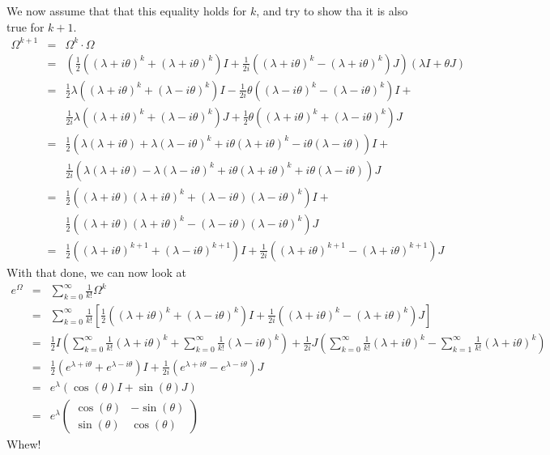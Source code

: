 \documentclass{article}
\newcommand{\twomatrix}[4]{\left(\begin{array}{cc} #1 & #2\\ #3 & #4 \end{array}\right)}
\begin{document}
We now assume that that this equality holds for $k$, and try to show tha it is also true for $k+1$.
\begin{eqnarray*}
\Omega^{k+1} &=&  \Omega^k \cdot \Omega\\
&=& \left( \frac{1}{2}\left((\lambda + i\theta)^k + (\lambda + i\theta)^k \right)I
  + \frac{1}{2i}\left((\lambda + i\theta)^k - (\lambda + i\theta)^k \right)J \right)(\lambda I + \theta J)\\
  &=& \frac{1}{2}\lambda\left( (\lambda + i\theta)^k + (\lambda - i\theta)^k \right)I  
     - \frac{1}{2i}\theta\left( (\lambda - i\theta)^k - (\lambda - i\theta)^k \right)I +\\
  &&  \frac{1}{2i}\lambda\left( (\lambda + i\theta)^k + (\lambda - i\theta)^k \right)J +
      \frac{1}{2}\theta\left( (\lambda + i\theta)^k + (\lambda - i\theta)^k \right)J\\
  &=& \frac{1}{2}\left( \lambda(\lambda + i\theta) + \lambda(\lambda - i\theta)^k +
                        i\theta(\lambda + i\theta)^k - i\theta(\lambda-i\theta)\right)I + \\
  && \frac{1}{2i}\left( \lambda(\lambda + i\theta) - \lambda(\lambda - i\theta)^k +
                        i\theta(\lambda + i\theta)^k + i\theta(\lambda-i\theta)\right)J\\
  &=& \frac{1}{2}\left((\lambda + i\theta)(\lambda + i\theta)^k +
                       (\lambda - i\theta)(\lambda - i\theta)^k \right)I + \\
  && \frac{1}{2}\left((\lambda + i\theta)(\lambda + i\theta)^k -
                       (\lambda - i\theta)(\lambda - i\theta)^k \right)J \\
  &=& \frac{1}{2}\left((\lambda + i\theta)^{k+1} + (\lambda - i\theta)^{k+1} \right)I
  + \frac{1}{2i}\left((\lambda + i\theta)^{k+1} - (\lambda + i\theta)^{k+1} \right) J
\end{eqnarray*}
With that done, we can now look at
\begin{eqnarray*}
  e^\Omega &=&  \sum_{k=0}^\infty\frac{1}{k!}\Omega^k\\
  &=& \sum_{k=0}^\infty \frac{1}{k!}\left[ \frac{1}{2}\left((\lambda + i\theta)^k + (\lambda - i\theta)^k \right)I
    +\frac{1}{2i}\left((\lambda + i\theta)^k - (\lambda + i\theta)^k \right)J \right]\\
    &=& \frac{1}{2}I\left( \sum_{k=0}^\infty \frac{1}{k!}(\lambda + i\theta)^k +
            \sum_{k=0}^\infty \frac{1}{k!}(\lambda - i\theta)^k\right)
    +\frac{1}{2i}J\left(\sum_{k=0}^\infty \frac{1}{k!}(\lambda + i\theta)^k - 
    \sum_{k=1}^\infty \frac{1}{k!}(\lambda + i\theta)^k \right)\\
    &=& \frac{1}{2} \left( e^{\lambda + i\theta} + e^{\lambda - i\theta}  \right)I +
       \frac{1}{2i} \left( e^{\lambda + i\theta} - e^{\lambda - i\theta}  \right)J \\
    &=& e^\lambda(\cos(\theta)I + \sin(\theta)J)\\
    &=& e^\lambda\twomatrix{\cos(\theta)}{-\sin(\theta)}{\sin(\theta)}{\cos(\theta)}
\end{eqnarray*}
Whew!
\end{document}
